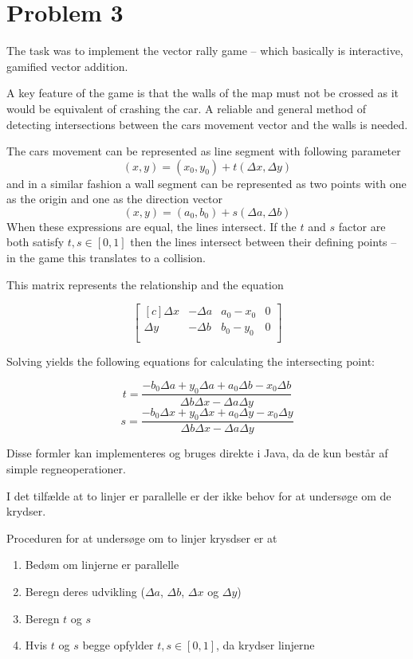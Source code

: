\section*{Problem 3}

The task was to implement the vector rally game -- which basically is
interactive, gamified vector addition.

A key feature of the game is that the walls of the map must not be crossed as
it would be equivalent of crashing the car. A reliable and general method of
detecting intersections between the cars movement vector and the walls is
needed.

The cars movement can be represented as line segment with following parameter
$$ (x, y) = (x_0, y_0) + t (\Delta x, \Delta y) $$
and in a similar fashion a wall segment can be represented as two points with
one as the origin and one as the direction vector
$$ (x, y) = (a_0, b_0) + s (\Delta a, \Delta b) $$
When these expressions are equal, the lines intersect. If the $t$ and $s$
factor are both satisfy $t, s \in [0,1]$ then the lines intersect between
their defining points -- in the game this translates to a collision.

This matrix represents the relationship and the equation

$$
\begin{bmatrix*}[c]
 \Delta x & -\Delta a & a_0 - x_0 & 0 \\
 \Delta y & -\Delta b & b_0 - y_0 & 0\\
\end{bmatrix*}
$$

Solving yields the following equations for calculating the 
intersecting point:

$$ t = \frac{-b_0 \Delta a + y_0 \Delta a + a_0 \Delta b - x_0 \Delta b}{\Delta b \Delta x - \Delta a \Delta y} $$
$$ s = \frac{-b_0 \Delta x + y_0 \Delta x + a_0 \Delta y - x_0 \Delta y}{\Delta b \Delta x - \Delta a \Delta y} $$

Disse formler kan implementeres og bruges direkte i Java, da de kun består af simple regneoperationer.

I det tilfælde at to linjer er parallelle er der ikke behov for at undersøge om de krydser.

Proceduren for at undersøge om to linjer krysdser er at
\begin{enumerate}
\item Bedøm om linjerne er parallelle
\item Beregn deres udvikling ($\Delta a$, $\Delta b$, $\Delta x$ og $\Delta y$)
\item Beregn $t$ og $s$
\item Hvis $t$ og $s$ begge opfylder $t, s \in [0,1]$, da krydser linjerne
\end{enumerate}
